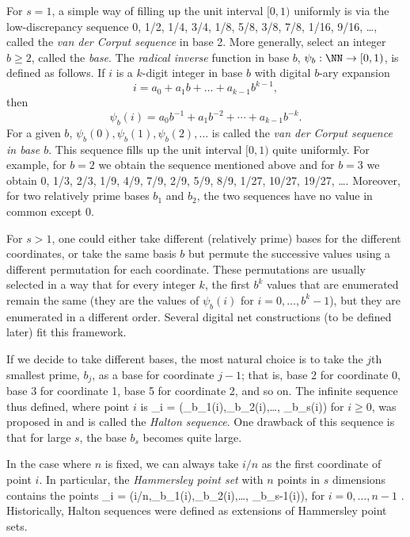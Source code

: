 For $s=1$, a simple way of filling up the unit interval $[0,1)$
uniformly is via the low-discrepancy sequence
0, 1/2, 1/4, 3/4, 1/8, 5/8, 3/8, 7/8, 1/16, 9/16, \ldots,
called the \emph{van der Corput sequence} in base 2.
More generally, select an integer $b \ge 2$, called the \emph{base}.
The \emph{radical inverse} function in base $b$, $\psi_b : \NN\to[0,1)$,
is defined as follows.  If $i$ is a $k$-digit integer in base $b$
with digital $b$-ary expansion
\[
  i = a_0 + a_1 b + \dots + a_{k-1} b^{k-1},
\]
then
\[
  \psi_b(i) = a_0 b^{-1} + a_1 b^{-2} + \cdots + a_{k-1} b^{-k}.
\]
For a given $b$, $\psi_b(0), \psi_b(1), \psi_b(2), \dots$
is called the \emph{van der Corput sequence in base $b$}.
This sequence fills up the unit interval $[0,1)$ quite uniformly.
For example, for $b=2$ we obtain the sequence mentioned above
and for $b=3$ we obtain
0, 1/3, 2/3, 1/9, 4/9, 7/9, 2/9, 5/9, 8/9, 1/27, 10/27, 19/27, \ldots.
Moreover, for two relatively prime bases $b_1$ and $b_2$, the two
sequences have no value in common except 0.

For $s > 1$, one could either take different (relatively prime)
bases for the different coordinates, or take the same basis $b$
but permute the successive values using a different permutation for
each coordinate.   These permutations are usually selected in a way
that for every integer $k$, the first $b^k$ values that are
enumerated remain the same (they are the values
of $\psi_b(i)$ for $i=0,\dots,b^k-1$), but they are enumerated in a
different order.  Several digital net constructions (to be defined later)
fit this framework.

If we decide to take different bases, the most natural choice is to
take the $j$th smallest prime, $b_j$, as a base for coordinate $j-1$;
that is, base 2 for coordinate 0, base 3 for coordinate 1,
base 5 for coordinate 2, and so on.
The infinite sequence thus defined, where point $i$ is
\eq
 \bu_i = (\psi_{b_1}(i),\psi_{b_2}(i),\dots, \psi_{b_{s}}(i))
\endeq
for $i \ge 0$, was proposed in \cite{rHAL60a} and is called
the \emph{Halton sequence}.
One drawback of this sequence is that for large $s$, the base $b_s$
becomes quite large.

In the case where $n$ is fixed,
we can always take $i/n$ as the first coordinate of point $i$.
In particular, the \emph{Hammersley point set} with $n$ points
in $s$ dimensions contains the points
\eq
 \bu_i = (i/n,\psi_{b_1}(i),\psi_{b_2}(i),\dots, \psi_{b_{s-1}}(i)),
\endeq
for $i=0,\dots,n-1$ \cite{rHAM60a}.
Historically, Halton sequences were defined as extensions of
Hammersley point sets.



